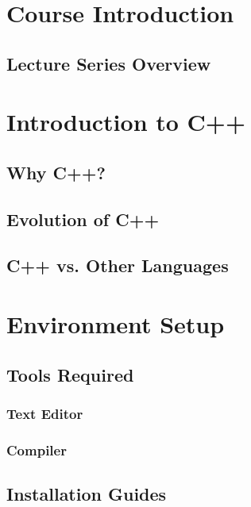 \documentclass{article}
\title{\thistitle}
\author{\me}
\date{\today}
\begin{document}
\maketitle
\tableofcontents
\pagebreak

\section{Course Introduction}

\subsection{Lecture Series Overview}

\section{Introduction to C++}

\subsection{Why C++?}

\subsection{Evolution of C++}

\subsection{C++ vs. Other Languages}

\section{Environment Setup}

\subsection{Tools Required}

\subsubsection{Text Editor}

\subsubsection{Compiler}

\subsection{Installation Guides}
\end{document}
